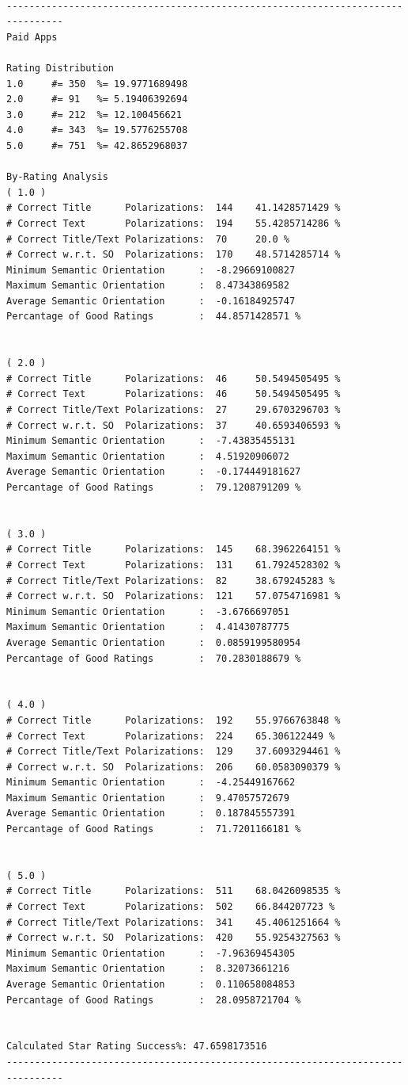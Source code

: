 \documentclass[11pt]{report} %
\begin{document}
\begin{verbatim}

--------------------------------------------------------------------------------
Paid Apps

Rating Distribution
1.0 	#= 350 	%= 19.9771689498
2.0 	#= 91 	%= 5.19406392694
3.0 	#= 212 	%= 12.100456621
4.0 	#= 343 	%= 19.5776255708
5.0 	#= 751 	%= 42.8652968037

By-Rating Analysis
( 1.0 )
# Correct Title      Polarizations:  144 	41.1428571429 %
# Correct Text       Polarizations:  194 	55.4285714286 %
# Correct Title/Text Polarizations:  70 	20.0 %
# Correct w.r.t. SO  Polarizations:  170 	48.5714285714 %
Minimum Semantic Orientation      :  -8.29669100827
Maximum Semantic Orientation      :  8.47343869582
Average Semantic Orientation      :  -0.16184925747
Percantage of Good Ratings        :  44.8571428571 %


( 2.0 )
# Correct Title      Polarizations:  46 	50.5494505495 %
# Correct Text       Polarizations:  46 	50.5494505495 %
# Correct Title/Text Polarizations:  27 	29.6703296703 %
# Correct w.r.t. SO  Polarizations:  37 	40.6593406593 %
Minimum Semantic Orientation      :  -7.43835455131
Maximum Semantic Orientation      :  4.51920906072
Average Semantic Orientation      :  -0.174449181627
Percantage of Good Ratings        :  79.1208791209 %


( 3.0 )
# Correct Title      Polarizations:  145 	68.3962264151 %
# Correct Text       Polarizations:  131 	61.7924528302 %
# Correct Title/Text Polarizations:  82 	38.679245283 %
# Correct w.r.t. SO  Polarizations:  121 	57.0754716981 %
Minimum Semantic Orientation      :  -3.6766697051
Maximum Semantic Orientation      :  4.41430787775
Average Semantic Orientation      :  0.0859199580954
Percantage of Good Ratings        :  70.2830188679 %


( 4.0 )
# Correct Title      Polarizations:  192 	55.9766763848 %
# Correct Text       Polarizations:  224 	65.306122449 %
# Correct Title/Text Polarizations:  129 	37.6093294461 %
# Correct w.r.t. SO  Polarizations:  206 	60.0583090379 %
Minimum Semantic Orientation      :  -4.25449167662
Maximum Semantic Orientation      :  9.47057572679
Average Semantic Orientation      :  0.187845557391
Percantage of Good Ratings        :  71.7201166181 %


( 5.0 )
# Correct Title      Polarizations:  511 	68.0426098535 %
# Correct Text       Polarizations:  502 	66.844207723 %
# Correct Title/Text Polarizations:  341 	45.4061251664 %
# Correct w.r.t. SO  Polarizations:  420 	55.9254327563 %
Minimum Semantic Orientation      :  -7.96369454305
Maximum Semantic Orientation      :  8.32073661216
Average Semantic Orientation      :  0.110658084853
Percantage of Good Ratings        :  28.0958721704 %


Calculated Star Rating Success%: 47.6598173516
--------------------------------------------------------------------------------

\end{verbatim}
\end{document}
